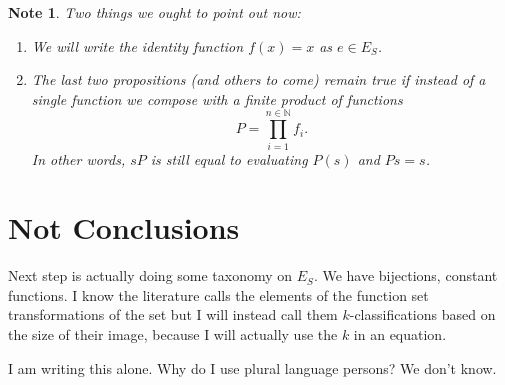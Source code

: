\documentclass[11pt]{article}
\theoremstyle{plain}
\newtheorem{note}[definition]{Note}
\theoremstyle{nonumberplain}
\newcommand{\N}{\mathbb{N}}
\begin{document}
\begin{note}
    Two things we ought to point out now: \begin{enumerate}
        \item We will write the identity function $f(x) = x$ as $e \in E_S$.
        \item The last two propositions (and others to come) remain true if instead of a single function we compose with a finite product of functions \begin{equation}
            P = \prod_{i = 1}^{n \in \N} f_i.
        \end{equation}
        In other words, $sP$ is still equal to evaluating $P(s)$ and $Ps = s$.
    \end{enumerate}
\end{note}

\section{Not Conclusions}

Next step is actually doing some taxonomy on $E_S$. We have bijections, constant functions. I know the literature calls the elements of the function set transformations of the set but I will instead call them $k$-classifications based on the size of their image, because I will actually use the $k$ in an equation.

I am writing this alone. Why do I use plural language persons? We don't know.
\end{document}
